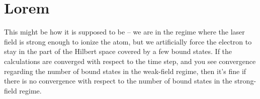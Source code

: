 \section{Lorem}
This might be how it is supposed to be -- we are in the regime where the laser field is strong enough to ionize the atom, 
but we artificially force the electron to stay in the part of the Hilbert space covered by a few bound states. 
If the calculations are converged with respect to the time step, and you see convergence regarding the number of bound states in the weak-field regime, 
then it's fine if there is no convergence with respect to the number of bound states in the strong-field regime.















